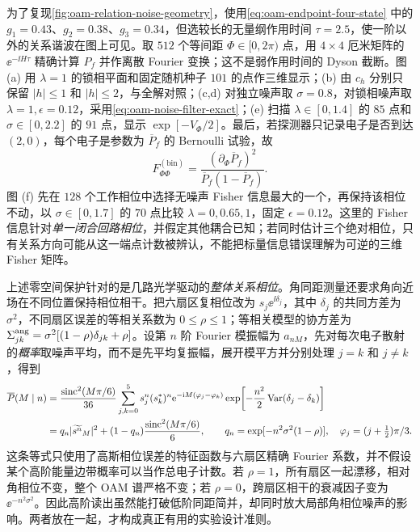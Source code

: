 为了复现\cref{fig:oam-relation-noise-geometry}，使用\cref{eq:oam-endpoint-four-state} 中的 $g_1=0.43$、$g_2=0.38$、$g_3=0.34$，但选较长的无量纲作用时间 $\tau=2.5$，使一阶以外的关系谐波在图上可见。取 $512$ 个等间距 $\Phi\in[0,2\pi)$ 点，用 $4\times4$ 厄米矩阵的 $\ee^{-\ii H\tau}$ 精确计算 $P_f$ 并作离散 Fourier 变换；这不是弱作用时间的 Dyson 截断。图 (a) 用 $\lambda=1$ 的锁相平面和固定随机种子 $101$ 的点作三维显示；(b) 由 $c_h$ 分别只保留 $|h|\le1$ 和 $|h|\le2$，与全解对照；(c,d) 对独立噪声取 $\sigma=0.8$，对锁相噪声取 $\lambda=1,\epsilon=0.12$，采用\cref{eq:oam-noise-filter-exact}；(e) 扫描 $\lambda\in[0,1.4]$ 的 $85$ 点和 $\sigma\in[0,2.2]$ 的 $91$ 点，显示 $\exp[-V_\Phi/2]$。最后，若探测器只记录电子是否到达 $(2,0)$，每个电子是参数为 $\overline P_f$ 的 Bernoulli 试验，故
\begin{equation}
 F_{\Phi\Phi}^{\mathrm{(bin)}}=\frac{(\partial_\Phi\overline P_f)^2}{\overline P_f(1-\overline P_f)}.
 \label{eq:oam-noise-binary-fisher}
\end{equation}
图 (f) 先在 $128$ 个工作相位中选择无噪声 Fisher 信息最大的一个，再保持该相位不动，以 $\sigma\in[0,1.7]$ 的 $70$ 点比较 $\lambda=0,0.65,1$，固定 $\epsilon=0.12$。这里的 Fisher 信息针对\emph{单一闭合回路相位}，并假定其他耦合已知；若同时估计三个绝对相位，只有关系方向可能从这一端点计数被辨认，不能把标量信息错误理解为可逆的三维 Fisher 矩阵。

上述零空间保护针对的是几路光学驱动的\emph{整体关系相位}。角同距测量还要求角向近场在不同位置保持相位相干。把六扇区复相位改为 $s_j\ee^{\ii\delta_j}$，其中 $\delta_j$ 的共同方差为 $\sigma^2$，不同扇区误差的等相关系数为 $0\le\rho\le1$；等相关模型的协方差为 $\Sigma^{\rm ang}_{jk}=\sigma^2[(1-\rho)\delta_{jk}+\rho]$。设第 $n$ 阶 Fourier 模振幅为 $a_{nM}$，先对每次电子散射的\emph{概率}取噪声平均，而不是先平均复振幅，展开模平方并分别处理 $j=k$ 和 $j\ne k$，得到
\begin{align}
 \overline{P}(M\mid n)&=\frac{\operatorname{sinc}^2(M\pi/6)}{36}
 \sum_{j,k=0}^{5}s_j^n(s_k^*)^n\mathrm{e}^{-\mathrm{i} M(\varphi_j-\varphi_k)}
 \exp\!\left[-\frac{n^2}{2}\operatorname{Var}(\delta_j-\delta_k)\right]\notag\\
 &=q_n|\widetilde{s^n}_M|^2+(1-q_n)\frac{\operatorname{sinc}^2(M\pi/6)}{6},\qquad
 q_n=\exp[-n^2\sigma^2(1-\rho)],\quad \varphi_j=(j+\tfrac12)\pi/3.
 \label{eq:oam-sector-dephasing-exact}
\end{align}
这条等式只使用了高斯相位误差的特征函数与六扇区精确 Fourier 系数，并不假设某个高阶能量边带概率可以当作总电子计数。若 $\rho=1$，所有扇区一起漂移，相对角相位不变，整个 OAM 谱严格不变；若 $\rho=0$，跨扇区相干的衰减因子变为 $\ee^{-n^2\sigma^2}$。因此高阶读出虽然能打破低阶同距简并，却同时放大局部角相位噪声的影响。两者放在一起，才构成真正有用的实验设计准则。

